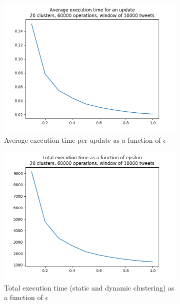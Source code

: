 \documentclass[a4paper,10pt]{article}
\begin{document}
\begin{appendices}
\begin{figure}[h]
	\begin{subfigure}[b]{0.3\textwidth}
		\includegraphics[width=\textwidth]{pictures/average_execution_times_per_update_20_60000_10000.png}
		\caption{Average execution time per update as a function of $\epsilon$}
	\end{subfigure}
	\begin{subfigure}[b]{0.3\textwidth}
		\includegraphics[width=\textwidth]{pictures/final_execution_times_20_60000_10000.png}
		\caption{Total execution time (static and dynamic clustering) as a function of $\epsilon$}
	\end{subfigure}
	\begin{subfigure}[b]{0.3\textwidth}

\end{subfigure}
\end{figure}
\end{appendices}
\end{document}
